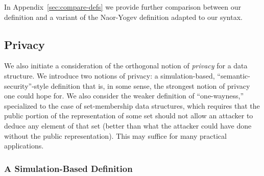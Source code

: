 In Appendix~\ref{sec:compare-defs} we provide further comparison between our
definition and a variant of the Naor-Yogev definition adapted to our syntax.

\def\bool{\{0,1\}}







\subsection{Privacy}

We also initiate a consideration of the orthogonal notion of \emph{privacy} for a data structure.
We introduce two notions of privacy: a simulation-based, ``semantic-security''-style
definition that is, in some sense, the strongest notion of privacy one could hope for.
We also consider the weaker definition of ``one-wayness,'' specialized to the case
of set-membership data structures, which requires that the public portion
of the representation of some set should not allow an attacker to deduce any element of that set
(better than what the attacker could have done without the public representation).
This may suffice for many practical applications.

\subsubsection{A Simulation-Based Definition }


